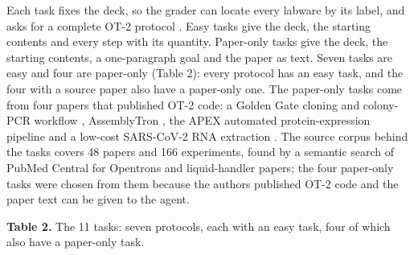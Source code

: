 \documentclass[
]{article}
\begin{document}
Each task fixes the deck, so the grader can locate every labware by its
label, and asks for a complete OT-2 protocol \citep{opentrons2026api}.
Easy tasks give the deck, the starting contents and every step with its
quantity. Paper-only tasks give the deck, the starting contents, a
one-paragraph goal and the paper as text. Seven tasks are easy and four
are paper-only (Table 2): every protocol has an easy task, and the four
with a source paper also have a paper-only one. The paper-only tasks
come from four papers that published OT-2 code: a Golden Gate cloning
and colony-PCR workflow \citep{malci2026slowpoke}, AssemblyTron
\citep{bryant2022assemblytron}, the APEX automated protein-expression
pipeline \citep{kasprzyk2024apex} and a low-cost SARS-CoV-2 RNA
extraction \citep{lazaroperona2021rna}. The source corpus behind the
tasks covers 48 papers and 166 experiments, found by a semantic search
of PubMed Central for Opentrons and liquid-handler papers; the four
paper-only tasks were chosen from them because the authors published
OT-2 code and the paper text can be given to the agent.

\textbf{Table 2.} The 11 tasks: seven protocols, each with an easy task,
four of which also have a paper-only task.
\end{document}
